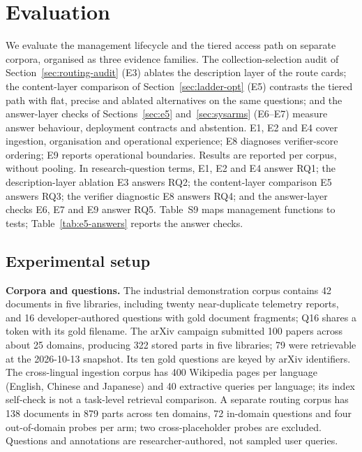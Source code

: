 \section{Evaluation}
\label{sec:eval}
We evaluate the management lifecycle and the tiered access path on separate
corpora, organised as three evidence families. The collection-selection audit
of Section~\ref{sec:routing-audit} (E3) ablates the description layer of the
route cards; the content-layer comparison of Section~\ref{sec:ladder-opt} (E5)
contrasts the tiered path with flat, precise and ablated alternatives on the
same questions; and the answer-layer checks of Sections~\ref{sec:e5}
and~\ref{sec:sysarms} (E6--E7) measure answer behaviour, deployment contracts
and abstention. E1, E2 and E4 cover ingestion, organisation and operational
experience; E8 diagnoses verifier-score ordering; E9 reports operational
boundaries. Results are reported per corpus, without pooling. In research-question
terms, E1, E2 and E4 answer RQ1; the description-layer ablation E3 answers
RQ2; the content-layer comparison E5 answers RQ3; the verifier diagnostic E8
answers RQ4; and the answer-layer checks E6, E7 and E9 answer RQ5.
Table~S9 maps
management functions to tests; Table~\ref{tab:e5-answers} reports the answer
checks.

\subsection{Experimental setup}
\label{sec:eval-setup}
\textbf{Corpora and questions.} The industrial demonstration corpus contains
42 documents in five libraries, including twenty near-duplicate telemetry
reports, and 16 developer-authored questions with gold document fragments; Q16
shares a token with its gold filename. The arXiv campaign submitted 100 papers
across about 25 domains, producing 322 stored parts in five libraries; 79 were
retrievable at the 2026-10-13 snapshot. Its ten gold questions are keyed by
arXiv identifiers. The cross-lingual ingestion corpus has 400 Wikipedia pages
per language (English, Chinese and Japanese) and 40 extractive queries per
language; its index self-check is not a task-level retrieval comparison. A
separate routing corpus has 138 documents in 879 parts across ten domains,
72 in-domain questions and four out-of-domain probes per arm; two
cross-placeholder probes are excluded. Questions and annotations are
researcher-authored, not sampled user queries.

